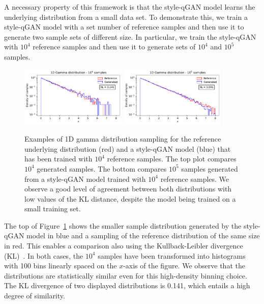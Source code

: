 \documentclass[twocolumn,preprintnumbers,superscriptaddress]{revtex4-2}
\begin{document}
A necessary property of this framework is that the style-qGAN model learns the underlying distribution from a small data set. To demonstrate this, we train a style-qGAN model with a set number of reference samples and then use it to generate two sample sets of different size. In particular, we train the style-qGAN with $10^4$ reference samples and then use it to generate sets of $10^4$ and $10^5$ samples.

\begin{figure}
  \includegraphics[width=0.45\textwidth]{plots/1Dgamma/1Dgamma_distribution_10k.pdf}
  \includegraphics[width=0.45\textwidth]{plots/1Dgamma/1Dgamma_distribution_100k.pdf}
  \caption{\label{fig:gamma} Examples of 1D gamma distribution sampling for the
  reference underlying distribution (red) and a style-qGAN model (blue) that has been
  trained with $10^4$ reference samples. The top plot compares $10^4$ generated samples. The bottom compares $10^5$ samples generated from a style-qGAN model trained with $10^4$ reference samples. We observe a good level of agreement between both distributions with low values of the KL distance, despite the model being trained on a small training set.}
\end{figure}

The top of Figure~\ref{fig:gamma} shows the smaller sample distribution generated by the style-qGAN model in blue and a sampling of the reference distribution of the same size in red. This enables a comparison also using the Kullback-Leibler divergence (KL)~\cite{kullback1951information}. In both cases, the $10^4$ samples have been transformed into histograms with 100 bins linearly spaced on the $x$-axis of the figure. We observe that the distributions are statistically similar even for this high-density binning choice. The KL divergence of two displayed distributions is 0.141, which entails a high degree of similarity.
\end{document}
